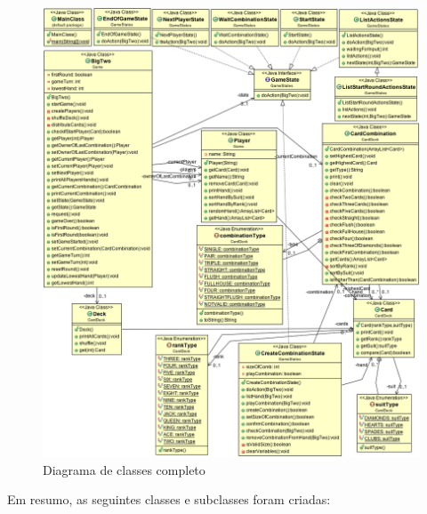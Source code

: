 \documentclass[12pt]{article}
\begin{document}
\begin{figure}[h!]
	\centering
	\includegraphics[width=.8\textwidth]{umlfull.png}
	\caption{Diagrama de classes completo}
	\label{umlfull}
\end{figure}

Em resumo, as seguintes classes e subclasses foram criadas:
\end{document}
